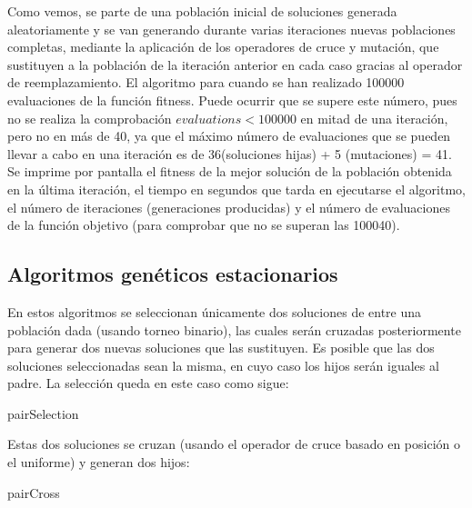 \documentclass[10pt,a4paper]{article}
\begin{document}
Como vemos, se parte de una población inicial de soluciones generada aleatoriamente y se van generando durante varias iteraciones nuevas poblaciones completas, mediante la aplicación de los operadores de cruce y mutación, que sustituyen a la población de la iteración anterior en cada caso gracias al operador de reemplazamiento. El algoritmo para cuando se han realizado 100000 evaluaciones de la función fitness. Puede ocurrir que se supere este número, pues no se realiza la comprobación $ evaluations<100000 $ en mitad de una iteración, pero no en más de 40, ya que el máximo número de evaluaciones que se pueden llevar a cabo en una iteración es de 36(soluciones hijas) + 5 (mutaciones) = 41. Se imprime por pantalla el fitness de la mejor solución de la población obtenida en la última iteración, el tiempo en segundos que tarda en ejecutarse el algoritmo, el número de iteraciones (generaciones producidas) y el número de evaluaciones de la función objetivo (para comprobar que no se superan las 100040).
 
\subsection{Algoritmos genéticos estacionarios}

En estos algoritmos se seleccionan únicamente dos soluciones de entre una población dada (usando torneo binario), las cuales serán cruzadas posteriormente para generar dos nuevas soluciones que las sustituyen. Es posible que las dos soluciones seleccionadas sean la misma, en cuyo caso los hijos serán iguales al padre. La selección queda en este caso como sigue: 


	\begin{algorithm}[H]
	\DontPrintSemicolon
	\caption{{\sc pairSelection} }
\end{algorithm}

Estas dos soluciones se cruzan (usando el operador de cruce basado en posición o el uniforme) y generan dos hijos: 

	\begin{algorithm}[H]
	\DontPrintSemicolon
	\caption{{\sc pairCross} }
\end{algorithm}
\end{document}
